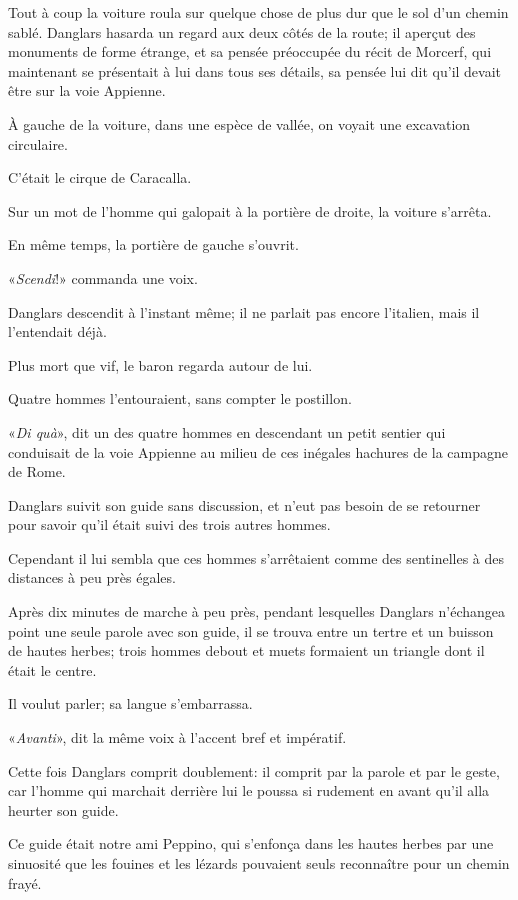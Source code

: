 Tout à coup la voiture roula sur quelque chose de plus dur que le sol d'un chemin sablé. Danglars hasarda un regard aux deux côtés de la route; il aperçut des monuments de forme étrange, et sa pensée préoccupée du récit de Morcerf, qui maintenant se présentait à lui dans tous ses détails, sa pensée lui dit qu'il devait être sur la voie Appienne. 

À gauche de la voiture, dans une espèce de vallée, on voyait une excavation circulaire. 

C'était le cirque de Caracalla. 

Sur un mot de l'homme qui galopait à la portière de droite, la voiture s'arrêta. 

En même temps, la portière de gauche s'ouvrit. 

«\textit{Scendi}!» commanda une voix. 

Danglars descendit à l'instant même; il ne parlait pas encore l'italien, mais il l'entendait déjà. 

Plus mort que vif, le baron regarda autour de lui. 

Quatre hommes l'entouraient, sans compter le postillon. 

«\textit{Di quà}», dit un des quatre hommes en descendant un petit sentier qui conduisait de la voie Appienne au milieu de ces inégales hachures de la campagne de Rome. 

Danglars suivit son guide sans discussion, et n'eut pas besoin de se retourner pour savoir qu'il était suivi des trois autres hommes. 

Cependant il lui sembla que ces hommes s'arrêtaient comme des sentinelles à des distances à peu près égales. 

Après dix minutes de marche à peu près, pendant lesquelles Danglars n'échangea point une seule parole avec son guide, il se trouva entre un tertre et un buisson de hautes herbes; trois hommes debout et muets formaient un triangle dont il était le centre. 

Il voulut parler; sa langue s'embarrassa. 

«\textit{Avanti}», dit la même voix à l'accent bref et impératif. 

Cette fois Danglars comprit doublement: il comprit par la parole et par le geste, car l'homme qui marchait derrière lui le poussa si rudement en avant qu'il alla heurter son guide. 

Ce guide était notre ami Peppino, qui s'enfonça dans les hautes herbes par une sinuosité que les fouines et les lézards pouvaient seuls reconnaître pour un chemin frayé. 

